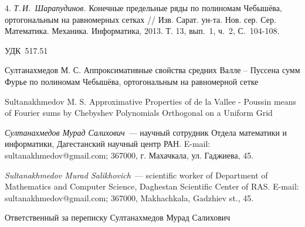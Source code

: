 \documentclass[12pt]{book}
\begin{document}
4. \textit{Т.\,И.~Шарапудинов.} Конечные предельные ряды по полиномам Чебыш\"ева, ортогональным на равномерных сетках // Изв. Сарат. ун-та. Нов. сер. Сер. Математика. Механика. Информатика, 2013. Т. 13, вып.~1, ч.~2, С.~104-108.



\newpage

\textsf{УДК~517.51}


Султанахмедов М. С. Аппроксимативные свойства средних Валле -- Пуссена сумм Фурье по полиномам Чебыш\"ева, ортогональным на равномерной сетке

Sultanakhmedov M. S. Approximative Properties of de la Vallee - Poussin means of Fourier sums by Chebyshev Polynomials Orthogonal on a Uniform Grid

\vspace*{5mm}

\noindent%
\textit{Султанахмедов Мурад Салихович}~--- научный сотрудник Отдела математики и информатики, Дагестанский научный центр РАН. E-mail: sultanakhmedov@gmail.com; 367000, г. Махачкала, ул. Гаджиева, 45. \vspace*{3pt}

\noindent%
\textit{Sultanakhmedov Murad Salikhovich}~--- scientific worker of Department of Mathematics and Computer Science, Daghestan Scientific Center of RAS. E-mail: sultanakhmedov@gmail.com; 367000, Makhachkala, Gadzhiev st., 45.



Ответственный за переписку Султанахмедов Мурад Салихович
\end{document}
